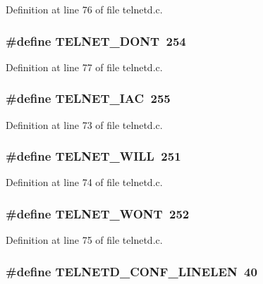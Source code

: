 Definition at line 76 of file telnetd.c.

\hypertarget{group__telnetd_ga3a4852e2372e34e1c0142d1147fbe027}{
\subsubsection[{TELNET\_\-DONT}]{\setlength{\rightskip}{0pt plus 5cm}\#define TELNET\_\-DONT~254}}
\label{group__telnetd_ga3a4852e2372e34e1c0142d1147fbe027}


Definition at line 77 of file telnetd.c.

\hypertarget{group__telnetd_ga8b600918f84783490fd791ce773175ab}{
\subsubsection[{TELNET\_\-IAC}]{\setlength{\rightskip}{0pt plus 5cm}\#define TELNET\_\-IAC~255}}
\label{group__telnetd_ga8b600918f84783490fd791ce773175ab}


Definition at line 73 of file telnetd.c.

\hypertarget{group__telnetd_ga6b2d00412304e2d95e7b853cce5858b0}{
\subsubsection[{TELNET\_\-WILL}]{\setlength{\rightskip}{0pt plus 5cm}\#define TELNET\_\-WILL~251}}
\label{group__telnetd_ga6b2d00412304e2d95e7b853cce5858b0}


Definition at line 74 of file telnetd.c.

\hypertarget{group__telnetd_ga3318dec654781e9d6d8ec873636660c6}{
\subsubsection[{TELNET\_\-WONT}]{\setlength{\rightskip}{0pt plus 5cm}\#define TELNET\_\-WONT~252}}
\label{group__telnetd_ga3318dec654781e9d6d8ec873636660c6}


Definition at line 75 of file telnetd.c.

\hypertarget{group__telnetd_ga26440a35353cb457747a4cea372c62e9}{
\subsubsection[{TELNETD\_\-CONF\_\-LINELEN}]{\setlength{\rightskip}{0pt plus 5cm}\#define TELNETD\_\-CONF\_\-LINELEN~40}}
\label{group__telnetd_ga26440a35353cb457747a4cea372c62e9}


